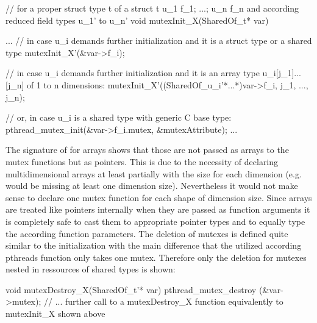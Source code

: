 \begin{ccode}
// for a proper struct type t of a struct t { u_1 f_1; ...; u_n f_n } and according reduced field types u_1' to u_n'
void mutexInit_X(SharedOf_t* var) {
  ...
  // in case u_i demands further initialization and it is a struct type or a shared type
  mutexInit_X'(&var->f_i);
  
  // in case u_i demands further initialization and it is an array type u_i[j_1]...[j_n] of 1 to n dimensions:
  mutexInit_X'((SharedOf_u_i'*...*)var->f_i, j_1, ..., j_n);
  
  // or, in case u_i is a shared type with generic C base type:
  pthread_mutex_init(&var->f_i.mutex, &mutexAttribute);
  ...
}
\end{ccode}
The signature of  for arrays shows that those are not passed as arrays to the mutex functions but as pointers. This is due to the necessity of declaring multidimensional arrays at least partially with the size for each dimension (e.g.  would be missing at least one dimension size). Nevertheless it would not make sense to declare one mutex function for each shape of dimension size. Since arrays are treated like pointers internally when they are passed as function arguments it is completely safe to cast them to appropriate pointer types and to equally type the according function parameters.
The deletion of mutexes is defined quite similar to the initialization with the main difference that the utilized according pthreads function only takes one mutex. Therefore only the deletion for mutexes nested in ressources of shared types is shown:
\begin{ccode}
void mutexDestroy_X(SharedOf_t'* var) { 
  pthread_mutex_destroy (&var->mutex); 
  // ... further call to a mutexDestroy_X function equivalently to mutexInit_X shown above
}
\end{ccode}
